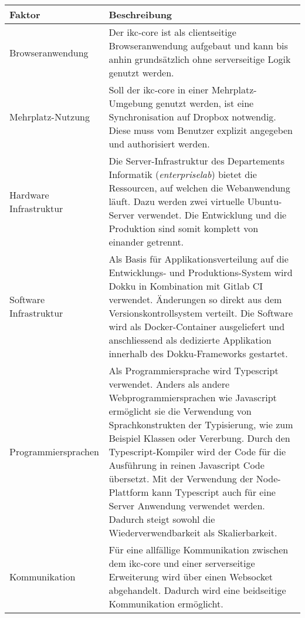 \begin{longtable}{|p{4cm}|p{8.5cm}|}

  \hline
    Faktor &  Beschreibung \\\hline
    Browseranwendung & Der \gls{ikc-core} ist als clientseitige Browseranwendung aufgebaut und kann bis anhin grundsätzlich ohne serverseitige Logik genutzt werden. %
    \\\hline
    Mehrplatz-Nutzung & Soll der \gls{ikc-core} in einer Mehrplatz-Umgebung genutzt werden, ist eine Synchronisation auf \gls{Dropbox} notwendig. Diese muss vom Benutzer explizit angegeben und authorisiert werden.\\\hline
    Hardware Infrastruktur & Die Server-Infrastruktur des Departements Informatik (\textit{enterpriselab}) bietet die Ressourcen, auf welchen die Webanwendung läuft. Dazu werden zwei virtuelle \gls{Ubuntu}-Server verwendet. Die Entwicklung und die Produktion sind somit komplett von einander getrennt.\\\hline
    
    Software Infrastruktur & Als Basis für Applikationsverteilung auf die Entwicklungs- und Produktions-System wird \gls{Dokku} in Kombination mit \gls{Gitlab CI} verwendet. Änderungen so direkt aus dem Versionskontrollsystem verteilt. Die Software wird als \gls{Docker}-Container ausgeliefert und anschliessend als dedizierte Applikation innerhalb des \gls{Dokku}-Frameworks gestartet.\\\hline
    
    Programmiersprachen & Als Programmiersprache wird \gls{Typescript} verwendet. Anders als andere Webprogrammiersprachen wie \gls{Javascript} ermöglicht sie die Verwendung von Sprachkonstrukten der Typisierung, wie zum Beispiel Klassen oder Vererbung. Durch den Typescript-Kompiler wird der Code für die Ausführung in reinen \gls{Javascript} Code übersetzt. Mit der Verwendung der \gls{Node}-Plattform kann \gls{Typescript} auch für eine Server Anwendung verwendet werden. Dadurch steigt sowohl die Wiederverwendbarkeit als Skalierbarkeit.\\\hline
    
    Kommunikation & Für eine allfällige Kommunikation zwischen dem \gls{ikc-core} und einer serverseitige Erweiterung wird über einen Websocket abgehandelt. Dadurch wird eine beidseitige Kommunikation ermöglicht. \\\hline
    

\end{longtable}
